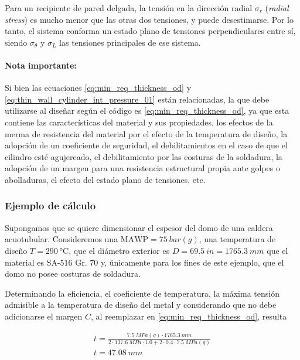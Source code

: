 Para un recipiente de pared delgada, la tensión en la dirección radial $\sigma_{r}$ (\textit{radial stress}) es mucho menor que las otras dos tensiones, y puede desestimarse. Por lo tanto, el sistema conforma un estado plano de tensiones perpendiculares entre sí, siendo $\sigma_{\theta}$ y $\sigma_L$ las tensiones principales de ese sistema.

\paragraph{Nota importante:} Si bien las ecuaciones \ref{eq:min_req_thickness_od} y \ref{eq:thin_wall_cylinder_int_pressure_01} están relacionadas, la que debe utilizarse al diseñar según el código es \ref{eq:min_req_thickness_od}, ya que esta contiene las características del material y sus propiedades, los efectos de la merma de resistencia del material por el efecto de la temperatura de diseño, la adopción de un coeficiente de seguridad, el debilitamientos en el caso de que el cilindro esté agujereado, el debilitamiento por las costuras de la soldadura, la adopción de un margen para una resistencia estructural propia ante golpes o abolladuras, el efecto del estado plano de tensiones, etc. 

\subsubsection{Ejemplo de cálculo}

Supongamos que se quiere dimensionar el espesor del domo de una caldera acuotubular. Consideremos una $\text{MAWP}=\SI{75}{bar(g)}$, una temperatura de diseño $T=\SI{290}{\celsius}$, que el diámetro exterior es $D=\SI{69,5}{in}=\SI{1765.3}{mm}$ que el material es SA-516 Gr. \num{70} y, únicamente para los fines de este ejemplo, que el domo no posee costuras de soldadura.

Determinando la eficiencia, el coeficiente de temperatura, la máxima tensión admisible a la temperatura de diseño del metal y considerando que no debe adicionarse el margen $C$, al reemplazar en \ref{eq:min_req_thickness_od}, resulta

\begin{gather*}
     t=\frac{\SI{7,5}{MPa(g)}\cdot\SI{1765,3}{mm}}{2\cdot\SI{137,6}{MPa}\cdot \num{1,0}+\num{2}\cdot \num{0,4}\cdot \SI{7,5}{MPa(g)}}\\
     \boxed{t=\SI{47,08}{mm}}
\end{gather*}



